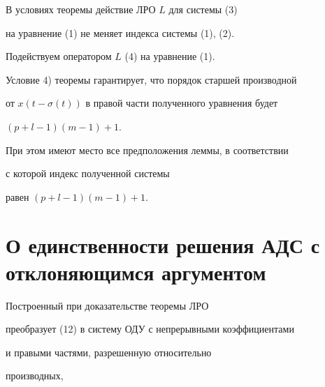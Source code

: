 \begin{cor}


В условиях теоремы действие ЛРО $L$ для системы (3) 


на уравнение (1) не меняет индекса системы (1), (2).


\end{cor}





\begin{pf}


Подействуем оператором $L$ (4) на уравнение (1).


Условие 4) теоремы гарантирует, что порядок старшей производной


от $x(t-\sigma(t))$ в правой части полученного уравнения будет 


$(p+l-1)(m-1)+1$.


При этом имеют место все предположения леммы, в соответствии


с которой индекс полученной системы 


равен $(p+l-1)(m-1)+1$.


\end{pf}





\section{О единственности решения АДС с отклоняющимся аргументом}





Построенный при доказательстве теоремы ЛРО 


преобразует (12) в систему ОДУ с непрерывными коэффициентами


и правыми частями, разрешенную относительно


производных,


